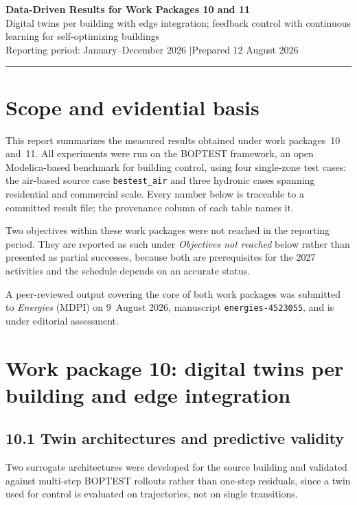 \documentclass[11pt,a4paper]{article}
\begin{document}
\begin{center}
{\Large\bfseries Data-Driven Results for Work Packages 10 and 11}\\[4pt]
{\large Digital twins per building with edge integration; feedback control with
continuous learning for self-optimizing buildings}\\[8pt]
{\small Reporting period: January--December 2026 \quad$\vert$\quad Prepared 12 August 2026}
\end{center}

\vspace{4pt}
\hrule
\vspace{10pt}

\section*{Scope and evidential basis}

This report summarizes the measured results obtained under work packages~10 and~11. All
experiments were run on the BOPTEST framework, an open Modelica-based benchmark for building
control, using four single-zone test cases: the air-based source case \texttt{bestest\_air} and
three hydronic cases spanning residential and commercial scale. Every number below is traceable
to a committed result file; the provenance column of each table names it.

Two objectives within these work packages were not reached in the reporting period. They are
reported as such under \emph{Objectives not reached} below rather than presented as partial successes, because
both are prerequisites for the 2027 activities and the schedule depends on an accurate status.

A peer-reviewed output covering the core of both work packages was submitted to
\emph{Energies} (MDPI) on 9~August 2026, manuscript \texttt{energies-4523055}, and is under
editorial assessment.

\section*{Work package 10: digital twins per building and edge integration}

\subsection*{10.1 Twin architectures and predictive validity}

Two surrogate architectures were developed for the source building and validated against
multi-step BOPTEST rollouts rather than one-step residuals, since a twin used for control is
evaluated on trajectories, not on single transitions.
\end{document}
